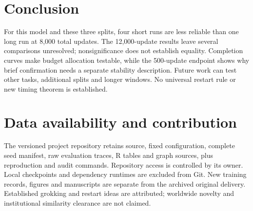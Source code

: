 \documentclass[conference,letterpaper]{IEEEtran}
\begin{document}
\section{Conclusion}

For this model and these three splits, four short runs are less reliable than one long run at 8,000 total updates. The 12,000-update results leave several comparisons unresolved; nonsignificance does not establish equality. Completion curves make budget allocation testable, while the 500-update endpoint shows why brief confirmation needs a separate stability description. Future work can test other tasks, additional splits and longer windows. No universal restart rule or new timing theorem is established.

\section{Data availability and contribution}

The versioned project repository retains source, fixed configuration, complete seed manifest, raw evaluation traces, R tables and graph sources, plus reproduction and audit commands. Repository access is controlled by its owner. Local checkpoints and dependency runtimes are excluded from Git. New training records, figures and manuscripts are separate from the archived original delivery. Established grokking and restart ideas are attributed; worldwide novelty and institutional similarity clearance are not claimed.
\end{document}
